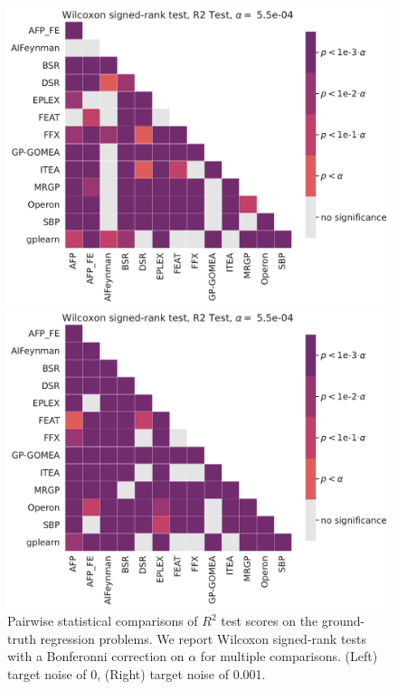 \begin{figure}
    \begin{minipage}{0.5\textwidth}
        \includegraphics[width=\textwidth]{figs/Pairwise_comparison_of_R2_Test_on_symbolic_problems_target_noise=0.0.pdf}
    \end{minipage}
    \begin{minipage}{0.5\textwidth}
        \includegraphics[width=\textwidth]{figs/Pairwise_comparison_of_R2_Test_on_symbolic_problems_target_noise=0.001.pdf}
    \end{minipage}
    \caption{ 
        Pairwise statistical comparisons of $R^2$ test scores on the ground-truth regression problems. 
        We report Wilcoxon signed-rank tests with a Bonferonni correction on $\alpha$ for multiple comparisons.
        (Left) target noise of 0, (Right) target noise of 0.001. 
    }
    \label{fig:heat_stats_r2_sr}
\end{figure}

